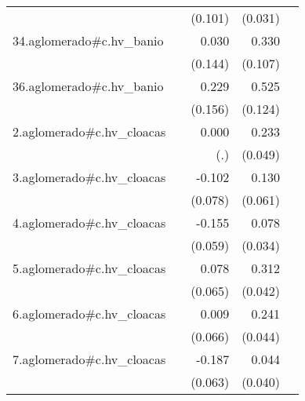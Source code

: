 {\begin{longtable}{l*{4}{D{.}{.}{-1}}}
            &                     &     (0.101)         &     (0.031)         &                     \\
\addlinespace
34.aglomerado#c.hv\_banio&                     &       0.030         &       0.330\sym{**} &                     \\
            &                     &     (0.144)         &     (0.107)         &                     \\
\addlinespace
36.aglomerado#c.hv\_banio&                     &       0.229         &       0.525\sym{***}&                     \\
            &                     &     (0.156)         &     (0.124)         &                     \\
\addlinespace
2.aglomerado#c.hv\_cloacas&                     &       0.000         &       0.233\sym{***}&                     \\
            &                     &         (.)         &     (0.049)         &                     \\
\addlinespace
3.aglomerado#c.hv\_cloacas&                     &      -0.102         &       0.130\sym{*}  &                     \\
            &                     &     (0.078)         &     (0.061)         &                     \\
\addlinespace
4.aglomerado#c.hv\_cloacas&                     &      -0.155\sym{**} &       0.078\sym{*}  &                     \\
            &                     &     (0.059)         &     (0.034)         &                     \\
\addlinespace
5.aglomerado#c.hv\_cloacas&                     &       0.078         &       0.312\sym{***}&                     \\
            &                     &     (0.065)         &     (0.042)         &                     \\
\addlinespace
6.aglomerado#c.hv\_cloacas&                     &       0.009         &       0.241\sym{***}&                     \\
            &                     &     (0.066)         &     (0.044)         &                     \\
\addlinespace
7.aglomerado#c.hv\_cloacas&                     &      -0.187\sym{**} &       0.044         &                     \\
            &                     &     (0.063)         &     (0.040)         &                     \\

\end{longtable}}
